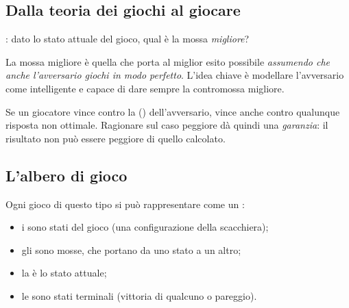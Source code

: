 \subsection{Dalla teoria dei giochi al giocare}

: dato lo stato attuale del gioco, qual è la mossa \emph{migliore}?

La mossa migliore è quella che porta al miglior esito possibile \emph{assumendo che anche
l'avversario giochi in modo perfetto}. L'idea chiave è modellare l'avversario come
intelligente e capace di dare sempre la contromossa migliore.

\begin{osservazione}
Se un giocatore vince contro la  () dell'avversario,
vince anche contro qualunque risposta non ottimale. Ragionare sul caso peggiore dà quindi
una \emph{garanzia}: il risultato non può essere peggiore di quello calcolato.
\end{osservazione}

\subsection{L'albero di gioco}

\begin{definizione}
Ogni gioco di questo tipo si può rappresentare come un :
\begin{itemize}
  \item i  sono stati del gioco (una configurazione della scacchiera);
  \item gli  sono mosse, che portano da uno stato a un altro;
  \item la  è lo stato attuale;
  \item le  sono stati terminali (vittoria di qualcuno o pareggio).
\end{itemize}
\end{definizione}

